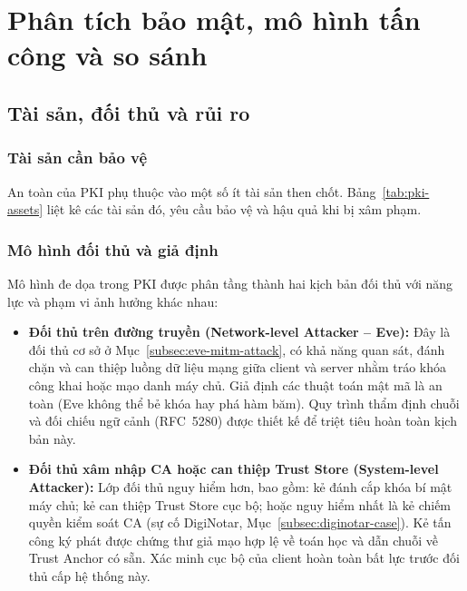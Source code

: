 \chapter{Phân tích bảo mật, mô hình tấn công và so sánh}
\label{chap:threat-security}
\section{Tài sản, đối thủ và rủi ro}
\label{sec:threat-model}
\subsection{Tài sản cần bảo vệ}
\label{subsec:pki-assets}

An toàn của PKI phụ thuộc vào một số ít tài sản then chốt. Bảng~\ref{tab:pki-assets} liệt kê các tài sản đó, yêu cầu bảo vệ và hậu quả khi bị xâm phạm.



\subsection{Mô hình đối thủ và giả định}
\label{subsec:threat-assumptions}

Mô hình đe dọa trong PKI được phân tầng thành hai kịch bản đối thủ với năng lực và phạm vi ảnh hưởng khác nhau:
\begin{itemize}\setlength{\itemsep}{1pt}\setlength{\parskip}{0pt}
    \item \textbf{Đối thủ trên đường truyền (Network-level Attacker -- Eve):} Đây là đối thủ cơ sở ở Mục~\ref{subsec:eve-mitm-attack}, có khả năng quan sát, đánh chặn và can thiệp luồng dữ liệu mạng giữa client và server nhằm tráo khóa công khai hoặc mạo danh máy chủ. Giả định các thuật toán mật mã là an toàn (Eve không thể bẻ khóa hay phá hàm băm). Quy trình thẩm định chuỗi và đối chiếu ngữ cảnh (RFC~5280) được thiết kế để triệt tiêu hoàn toàn kịch bản này.
    \item \textbf{Đối thủ xâm nhập CA hoặc can thiệp Trust Store (System-level Attacker):} Lớp đối thủ nguy hiểm hơn, bao gồm: kẻ đánh cắp khóa bí mật máy chủ; kẻ can thiệp Trust Store cục bộ; hoặc nguy hiểm nhất là kẻ chiếm quyền kiểm soát CA (sự cố DigiNotar, Mục~\ref{subsec:diginotar-case}). Kẻ tấn công ký phát được chứng thư giả mạo hợp lệ về toán học và dẫn chuỗi về Trust Anchor có sẵn. Xác minh cục bộ của client hoàn toàn bất lực trước đối thủ cấp hệ thống này.
\end{itemize}

